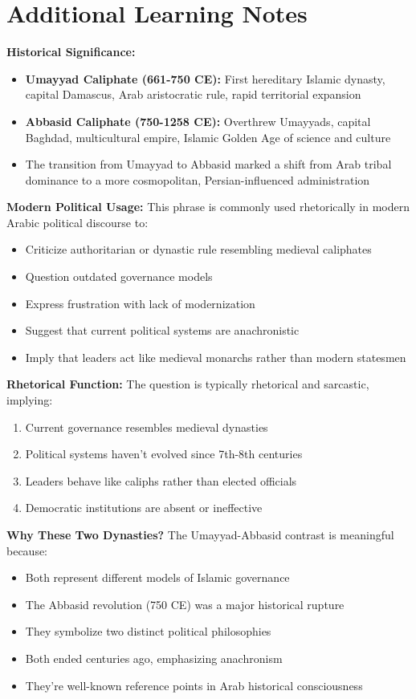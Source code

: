 \documentclass[letterpaper,12pt]{article}
\begin{document}
\section{Additional Learning Notes}
\noindent
\begin{tcolorbox}[breakable,colback=boxcolor,colframe=accentcolor,title=\textbf{Cultural and Historical Context}]

\textbf{Historical Significance:}
\begin{itemize}
\item \textbf{Umayyad Caliphate (661-750 CE):} First hereditary Islamic dynasty, capital Damascus, Arab aristocratic rule, rapid territorial expansion
\item \textbf{Abbasid Caliphate (750-1258 CE):} Overthrew Umayyads, capital Baghdad, multicultural empire, Islamic Golden Age of science and culture
\item The transition from Umayyad to Abbasid marked a shift from Arab tribal dominance to a more cosmopolitan, Persian-influenced administration
\end{itemize}

\textbf{Modern Political Usage:}
This phrase is commonly used rhetorically in modern Arabic political discourse to:
\begin{itemize}
\item Criticize authoritarian or dynastic rule resembling medieval caliphates
\item Question outdated governance models
\item Express frustration with lack of modernization
\item Suggest that current political systems are anachronistic
\item Imply that leaders act like medieval monarchs rather than modern statesmen
\end{itemize}

\textbf{Rhetorical Function:}
The question is typically rhetorical and sarcastic, implying:
\begin{enumerate}
\item Current governance resembles medieval dynasties
\item Political systems haven't evolved since 7th-8th centuries
\item Leaders behave like caliphs rather than elected officials
\item Democratic institutions are absent or ineffective
\end{enumerate}

\textbf{Why These Two Dynasties?}
The Umayyad-Abbasid contrast is meaningful because:
\begin{itemize}
\item Both represent different models of Islamic governance
\item The Abbasid revolution (750 CE) was a major historical rupture
\item They symbolize two distinct political philosophies
\item Both ended centuries ago, emphasizing anachronism
\item They're well-known reference points in Arab historical consciousness
\end{itemize}


\end{tcolorbox}
\end{document}
